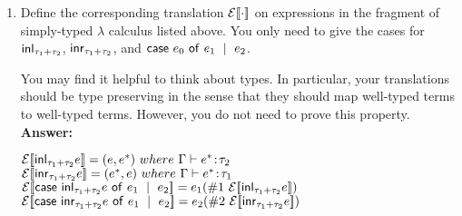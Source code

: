 \documentclass[10pt]{article}
\begin{document}
\begin{exercise}
\begin{enumerate}
\item Define the corresponding translation ${\cal E}[\![\cdot]\!]$ on
  expressions in the fragment of simply-typed $\lambda$ calculus
  listed above. You only need to give the cases for
  $\mathsf{inl}_{\tau_1+\tau_2}$, $\mathsf{inr}_{\tau_1+\tau_2}$, and
  $\mathsf{case}~{e_0}~\mathsf{of}~{e_1}~\mid~{e_2}$. 

  You may find it helpful to think about types.  In particular, your
  translations should be type preserving in the sense that they should
  map well-typed terms to well-typed terms. However, you do not need
  to prove this property. \\[0.1cm]
\noindent \textbf{Answer:}
\begin{center}
	${\cal E}[\![\mathsf{inl}_{\tau_1+\tau_2}{e}]\!] = (e, e^*)\ where\ \Gamma \vdash e^* \!:\! \tau_2$ \\
	${\cal E}[\![\mathsf{inr}_{\tau_1+\tau_2}{e}]\!] = (e^*, e)\ where\ \Gamma \vdash e^* \!:\! \tau_1$ \\
	${\cal E}[\![\mathsf{case}~{\mathsf{inl}_{\tau_1+\tau_2}{e}}~\mathsf{of}~{e_1}~\mid~{e_2}]\!] = e_1(\#1\ {\cal E}[\![\mathsf{inl}_{\tau_1+\tau_2}{e}]\!])$ \\
	${\cal E}[\![\mathsf{case}~{\mathsf{inr}_{\tau_1+\tau_2}{e}}~\mathsf{of}~{e_1}~\mid~{e_2}]\!] = e_2(\#2\ {\cal E}[\![\mathsf{inr}_{\tau_1+\tau_2}{e}]\!])$
\end{center}

\end{enumerate}
\end{exercise}
\end{document}
